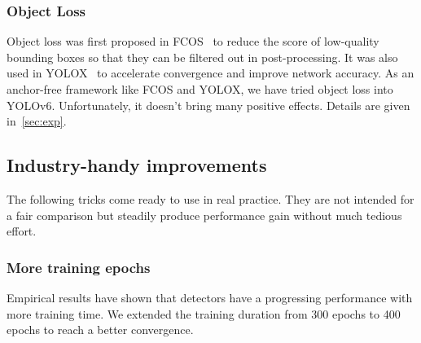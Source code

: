 \documentclass[10pt,twocolumn,letterpaper]{article}
\begin{document}
  \subsubsection{Object Loss}
  Object loss was first proposed in FCOS~\cite{tian2019fcos} to reduce the score of low-quality bounding boxes so that they can be filtered out in post-processing. 
It was also used in YOLOX~\cite{ge2021yolox} to accelerate convergence and improve network accuracy. As an anchor-free framework like FCOS and YOLOX, we have tried object loss into YOLOv6. Unfortunately, it doesn't bring many positive effects. Details are given in~\cref{sec:exp}.















  \subsection{Industry-handy improvements}
  \label{sec:method:further}
  The following tricks come ready to use in real practice. They are not intended for a fair comparison but steadily produce performance gain without much tedious effort.
   
  \subsubsection{More training epochs}
  Empirical results have shown that detectors have a progressing performance with more training time. We extended the training duration from 300 epochs to 400 epochs to reach a better convergence.

  
  
  
\end{document}
